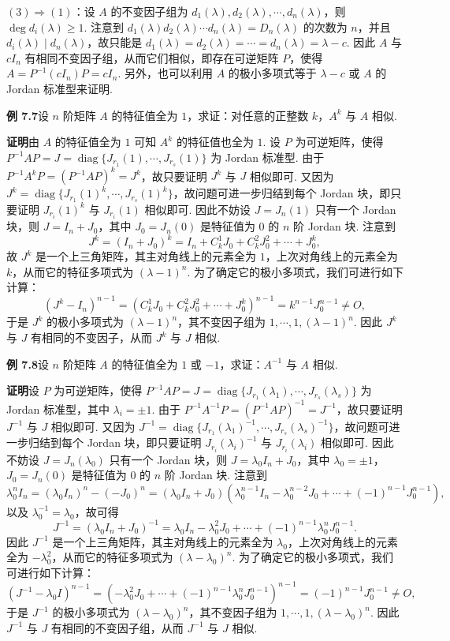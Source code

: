 \documentclass[UTF8,12pt,a4paper,fontset=fandol]{ctexart}
\begin{document}
$(3)\Rightarrow(1)$：设 $A$ 的不变因子组为 $d_1(\lambda),d_2(\lambda),\cdots,d_n(\lambda)$，则 $\deg d_i(\lambda)\ge 1$. 注意到 $d_1(\lambda)d_2(\lambda)\cdots d_n(\lambda)=D_n(\lambda)$ 的次数为 $n$，并且 $d_i(\lambda)\mid d_n(\lambda)$，故只能是 $d_1(\lambda)=d_2(\lambda)=\cdots=d_n(\lambda)=\lambda-c$. 因此 $A$ 与 $cI_n$ 有相同不变因子组，从而它们相似，即存在可逆矩阵 $P$，使得 $A=P^{-1}(cI_n)P=cI_n$. 另外，也可以利用 $A$ 的极小多项式等于 $\lambda-c$ 或 $A$ 的 Jordan 标准型来证明.

\noindent\textbf{例 7.7}\quad 设 $n$ 阶矩阵 $A$ 的特征值全为 $1$，求证：对任意的正整数 $k$，$A^k$ 与 $A$ 相似.

\noindent\textbf{证明}\quad 由 $A$ 的特征值全为 $1$ 可知 $A^k$ 的特征值也全为 $1$. 设 $P$ 为可逆矩阵，使得 $P^{-1}AP=J=\operatorname{diag}\{J_{r_1}(1),\cdots,J_{r_s}(1)\}$ 为 Jordan 标准型. 由于 $P^{-1}A^kP=(P^{-1}AP)^k=J^k$，故只要证明 $J^k$ 与 $J$ 相似即可. 又因为 $J^k=\operatorname{diag}\{J_{r_1}(1)^k,\cdots,J_{r_s}(1)^k\}$，故问题可进一步归结到每个 Jordan 块，即只要证明 $J_{r_i}(1)^k$ 与 $J_{r_i}(1)$ 相似即可. 因此不妨设 $J=J_n(1)$ 只有一个 Jordan 块，则 $J=I_n+J_0$，其中 $J_0=J_n(0)$ 是特征值为 $0$ 的 $n$ 阶 Jordan 块. 注意到
\[
J^k=(I_n+J_0)^k=I_n+C_k^1J_0+C_k^2J_0^2+\cdots+J_0^k,
\]
故 $J^k$ 是一个上三角矩阵，其主对角线上的元素全为 $1$，上次对角线上的元素全为 $k$，从而它的特征多项式为 $(\lambda-1)^n$. 为了确定它的极小多项式，我们可进行如下计算：
\[
(J^k-I_n)^{n-1}=(C_k^1J_0+C_k^2J_0^2+\cdots+J_0^k)^{n-1}=k^{n-1}J_0^{n-1}\ne O,
\]
于是 $J^k$ 的极小多项式为 $(\lambda-1)^n$，其不变因子组为 $1,\cdots,1,(\lambda-1)^n$. 因此 $J^k$ 与 $J$ 有相同的不变因子，从而 $J^k$ 与 $J$ 相似.

\noindent\textbf{例 7.8}\quad 设 $n$ 阶矩阵 $A$ 的特征值全为 $1$ 或 $-1$，求证：$A^{-1}$ 与 $A$ 相似.

\noindent\textbf{证明}\quad 设 $P$ 为可逆矩阵，使得 $P^{-1}AP=J=\operatorname{diag}\{J_{r_1}(\lambda_1),\cdots,J_{r_s}(\lambda_s)\}$ 为 Jordan 标准型，其中 $\lambda_i=\pm 1$. 由于 $P^{-1}A^{-1}P=(P^{-1}AP)^{-1}=J^{-1}$，故只要证明 $J^{-1}$ 与 $J$ 相似即可. 又因为 $J^{-1}=\operatorname{diag}\{J_{r_1}(\lambda_1)^{-1},\cdots,J_{r_s}(\lambda_s)^{-1}\}$，故问题可进一步归结到每个 Jordan 块，即只要证明 $J_{r_i}(\lambda_i)^{-1}$ 与 $J_{r_i}(\lambda_i)$ 相似即可. 因此不妨设 $J=J_n(\lambda_0)$ 只有一个 Jordan 块，则 $J=\lambda_0I_n+J_0$，其中 $\lambda_0=\pm 1$，$J_0=J_n(0)$ 是特征值为 $0$ 的 $n$ 阶 Jordan 块. 注意到
\[
\lambda_0^nI_n=(\lambda_0I_n)^n-(-J_0)^n=(\lambda_0I_n+J_0)(\lambda_0^{n-1}I_n-\lambda_0^{n-2}J_0+\cdots+(-1)^{n-1}J_0^{n-1}),
\]
以及 $\lambda_0^{-1}=\lambda_0$，故可得
\[
J^{-1}=(\lambda_0I_n+J_0)^{-1}=\lambda_0I_n-\lambda_0^2J_0+\cdots+(-1)^{n-1}\lambda_0^nJ_0^{n-1}.
\]
因此 $J^{-1}$ 是一个上三角矩阵，其主对角线上的元素全为 $\lambda_0$，上次对角线上的元素全为 $-\lambda_0^2$，从而它的特征多项式为 $(\lambda-\lambda_0)^n$. 为了确定它的极小多项式，我们可进行如下计算：
\[
(J^{-1}-\lambda_0I)^{n-1}=(-\lambda_0^2J_0+\cdots+(-1)^{n-1}\lambda_0^nJ_0^{n-1})^{n-1}=(-1)^{n-1}J_0^{n-1}\ne O,
\]
于是 $J^{-1}$ 的极小多项式为 $(\lambda-\lambda_0)^n$，其不变因子组为 $1,\cdots,1,(\lambda-\lambda_0)^n$. 因此 $J^{-1}$ 与 $J$ 有相同的不变因子组，从而 $J^{-1}$ 与 $J$ 相似.
\end{document}
